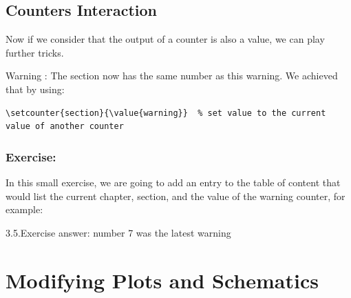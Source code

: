\documentclass[a4paper,10pt]{report} %
\begin{document}
\setcounter{section}{\value{warning}}

\subsection{Counters Interaction}
Now if we consider that the output of a counter is also a value, we can play further tricks. 

Warning :  The section now has the same number as this warning. We achieved that by using:\\

\begin{lstlisting}[language={[latex]tex}, frame=single,basicstyle=\footnotesize\color{darkgray}, 
  keywordstyle=\bf\color{magenta},
  commentstyle=\color{ForestGreen},  
  breaklines=true
  ]
\setcounter{section}{\value{warning}}  % set value to the current  value of another counter 
\end{lstlisting}

\subsubsection{Exercise:}
In this small exercise, we are going to add an entry to the table of content that would list the current chapter, section, and the value of the warning counter, for example:\\

\begin{center}
 3.5.Exercise answer: number 7 was the latest warning 
\end{center}




\newpage 
 \section{Modifying Plots and Schematics}\label{sec:figures}
 
\end{document}
